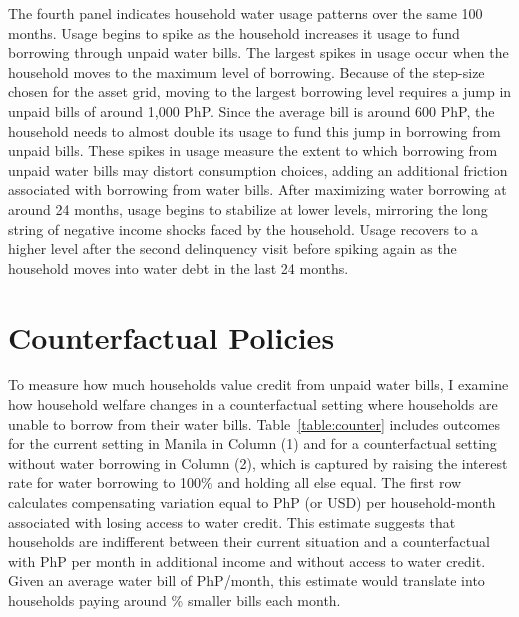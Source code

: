 \documentclass[12pt]{article}
\begin{document}
The fourth panel indicates household water usage patterns over the same 100 months.  Usage begins to spike as the household increases it usage to fund borrowing through unpaid water bills.  The largest spikes in usage occur when the household moves to the maximum level of borrowing.  Because of the step-size chosen for the asset grid, moving to the largest borrowing level requires a jump in unpaid bills of around 1,000 PhP.  Since the average bill is around 600 PhP, the household needs to almost double its usage to fund this jump in borrowing from unpaid bills.  These spikes in usage measure the extent to which borrowing from unpaid water bills may distort consumption choices, adding an additional friction associated with borrowing from water bills.  After maximizing water borrowing at around 24 months, usage begins to stabilize at lower levels, mirroring the long string of negative income shocks faced by the household.  Usage recovers to a higher level after the second delinquency visit before spiking again as the household moves into water debt in the last 24 months.

\section{Counterfactual Policies}\label{section:counterfactuals}
To measure how much households value credit from unpaid water bills, I examine how household welfare changes in a counterfactual setting where households are unable to borrow from their water bills.  Table~\ref{table:counter} includes outcomes for the current setting in Manila in Column (1) and for a counterfactual setting without water borrowing in Column (2), which is captured by raising the interest rate for water borrowing to 100\% and holding all else equal.  The first row calculates compensating variation equal to PhP (or USD) per household-month associated with losing access to water credit.  This estimate suggests that households are indifferent between their current situation and a counterfactual with PhP per month in additional income and without access to water credit.  Given an average water bill of PhP/month, this estimate would translate into households paying around \unskip\% smaller bills each month.  
\end{document}
